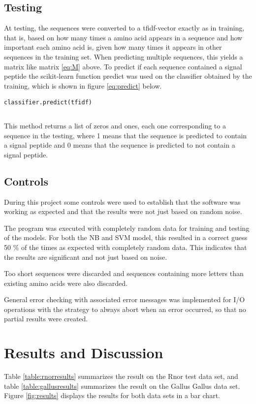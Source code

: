 \documentclass[10pt]{article}
\begin{document}
\subsection{Testing}
At testing, the sequences were converted to a tfidf-vector exactly as in training, that is, based on how many times a amino acid appears in a sequence and how important each amino acid is, given how many times it appears in other sequences in the training set.
When predicting multiple sequences, this yields a matrix like matrix \ref{eq:M} above.
To predict if each sequence contained a signal peptide the scikit-learn function predict was used on the classifier obtained by the training, which is shown in figure \ref{eq:predict} below.

\begin{lstlisting}
classifier.predict(tfidf)
\end{lstlisting}
\begin{equation}
\label{eq:predict}
\end{equation}

This method returns a list of zeros and ones, each one corresponding to a sequence in the testing, where 1 means that the sequence is predicted to contain a signal peptide and 0 means that the sequence is predicted to not contain a signal peptide.

\subsection{Controls}
During this project some controls were used to establish that the software was working as expected and that the results were not just based on random noise.

The program was executed with completely random data for training and testing of the models. For both the NB and SVM model, this resulted in a correct guess 50 \% of the times as expected with completely random data. This indicates that the results are significant and not just based on noise.

Too short sequences were discarded and sequences containing more letters than existing amino acids were also discarded.

General error checking with associated error messages was implemented for I/O operations with the strategy to always abort when an error occurred, so that no partial results were created.

\section{Results and Discussion}
Table \ref{table:rnorresults} summarizes the result on the Rnor test data set, and
table \ref{table:gallusresults} summarizes the result on the Gallus Gallus data set.
Figure \ref{fig:results} displays the results for both data sets in a bar chart.
\end{document}

